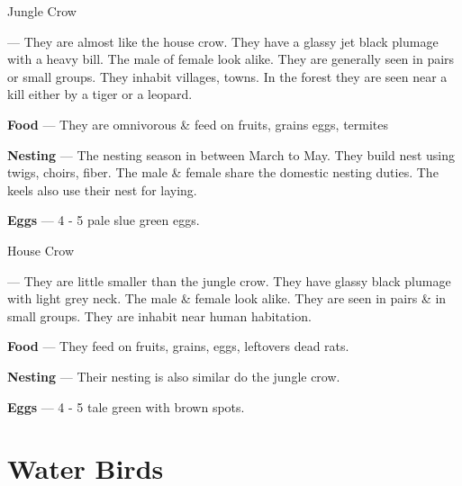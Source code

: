 \begin{bird}{Jungle Crow}

 --- They are almost like the house crow. They have a glassy jet black plumage with a heavy bill. The male of female look alike. They are generally seen in pairs or small groups. They inhabit villages, towns. In the forest they are seen near a kill either by a tiger or a leopard.

{\large\bf Food} --- They are omnivorous \& feed on fruits, grains eggs, termites

{\large\bf Nesting} --- The nesting season in between March to May. They build nest using twigs, choirs, fiber. The male \& female share the domestic nesting duties. The keels also use their nest for laying. 

{\large\bf Eggs} --- 4 - 5 pale slue green eggs.
\end{bird}

\begin{bird}{House Crow}

 --- They are little smaller than the jungle crow. They have glassy black plumage with light grey neck. The male \& female look alike. They are seen in pairs \& in small groups. They are inhabit near human habitation.

{\large\bf Food} --- They feed on fruits, grains, eggs, leftovers dead rats.

{\large\bf Nesting} --- Their nesting is also similar do the jungle crow.

{\large\bf Eggs} --- 4 - 5 tale green with brown spots.
\end{bird}

\part{Water Birds}


